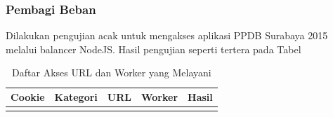 \documentclass{ta-its}
\begin{document}
				\subsubsection{Pembagi Beban}
					Dilakukan pengujian acak untuk mengakses aplikasi PPDB Surabaya 2015 melalui balancer NodeJS. Hasil pengujian seperti tertera pada Tabel
					
					\begin{longtable}{|p{0.13\textwidth}|p{}|p{}|p{}|p{}|} %
						
						\caption{Daftar Akses URL dan Worker yang Melayani} \label{tabelBagiBeban} \\
						\hline
						\textbf{Cookie} & \textbf{Kategori} & \textbf{URL} & \textbf{Worker} & \textbf{Hasil}\\ \hline
						
						\endhead
						\endfoot
						\endlastfoot
						

\end{longtable}
\end{document}
